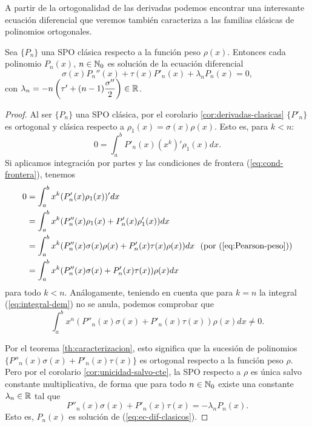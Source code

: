 A partir de la ortogonalidad de las derivadas podemos encontrar una interesante ecuación diferencial que veremos también caracteriza a las familias clásicas de polinomios ortogonales.

\begin{teorema}
    \label{th:ec-hipergeometrica}
    Sea $\{P_n\}$ una SPO clásica respecto a la función peso $\rho(x)$. Entonces cada polinomio $P_n(x)$, $n\in\mathbb{N}_0$ es solución de la ecuación diferencial
    \begin{equation}
        \label{eq:ec-dif-clasicos}
        \sigma(x)P_n''(x) + \tau(x)P'_n(x)+\lambda_n P_n(x) = 0,
    \end{equation}
    con $\lambda_n = -n\left(\tau' + (n-1)\dfrac{\sigma''}{2}\right)\in\mathbb{R}$.
\end{teorema}
\begin{proof}
    Al ser $\{P_n\}$ una SPO clásica, por el corolario \ref{cor:derivadas-clasicas} $\{P'_n\}$ es ortogonal y clásica respecto a $\rho_1(x)=\sigma(x)\rho(x)$. Esto es, para $k<n$:
    \begin{equation}
        \label{eq:integral-dem}
        0=\int_a^b P'_n(x)(x^k)' \rho_1(x)dx.
    \end{equation}
    Si aplicamos integración por partes y las condiciones de frontera (\ref{eq:cond-frontera}), tenemos
    \begin{equation*}
        \begin{split}
            0&= \int_a^b x^k (P'_n(x) \rho_1(x))'dx \\
            &= \int_a^b x^k (P''_n(x) \rho_1(x)+P'_n(x)\rho_1'(x))dx  \\
            &= \int_a^b x^k (P''_n(x)\sigma(x)\rho(x)+P'_n(x)\tau(x)\rho(x))dx \ \ \text{(por (\ref{eq:Pearson-peso}))}  \\
            &= \int_a^b x^k (P''_n(x)\sigma(x)+P'_n(x)\tau(x))\rho(x)dx
        \end{split}
    \end{equation*}
    para todo $k<n$. Análogamente, teniendo en cuenta que para $k=n$ la integral (\ref{eq:integral-dem}) no se anula, podemos comprobar que
    $$
    \int_a^b x^n (P''_n(x)\sigma(x)+P'_n(x)\tau(x))\rho(x)dx  \neq 0.
    $$
    
    Por el teorema \ref{th:caracterizacion}, esto significa que la sucesión de polinomios $\{P''_n(x)\sigma(x)+P'_n(x)\tau(x)\}$ es ortogonal respecto a la función peso $\rho$. Pero por el corolario \ref{cor:unicidad-salvo-cte}, la SPO respecto a $\rho$ es única salvo constante multiplicativa, de forma que para todo $n\in\mathbb{N}_0$ existe una constante $\lambda_n\in\mathbb{R}$ tal que
    $$
    P''_n(x)\sigma(x)+P'_n(x)\tau(x) = -\lambda_n P_n(x).
    $$
    Esto es, $P_n(x)$ es solución de (\ref{eq:ec-dif-clasicos}).


\end{proof}
